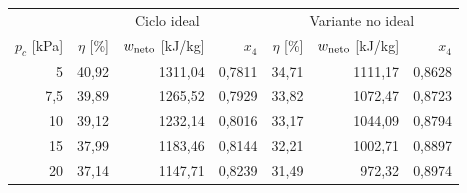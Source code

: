 \begin{tabular}{rrrrrrr}
\toprule
& \multicolumn{3}{c}{Ciclo ideal} & \multicolumn{3}{c}{Variante no ideal}\\
$p_c$ [kPa] & $\eta$ [\%] & $w_{\rm neto}$ [kJ/kg] & $x_4$ & $\eta$ [\%] & $w_{\rm neto}$ [kJ/kg] & $x_4$\\
\midrule
5 & 40,92 & 1311,04 & 0,7811 & 34,71 & 1111,17 & 0,8628 \\
7,5 & 39,89 & 1265,52 & 0,7929 & 33,82 & 1072,47 & 0,8723 \\
10 & 39,12 & 1232,14 & 0,8016 & 33,17 & 1044,09 & 0,8794 \\
15 & 37,99 & 1183,46 & 0,8144 & 32,21 & 1002,71 & 0,8897 \\
20 & 37,14 & 1147,71 & 0,8239 & 31,49 & 972,32 & 0,8974 \\
\bottomrule
\end{tabular}
